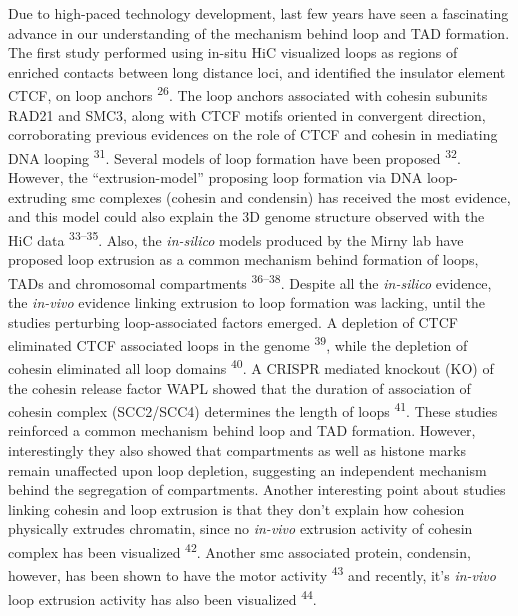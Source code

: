 \documentclass[11pt,twoside]{MPIthesis}
\theoremstyle{definition}
\theoremstyle{definition}
\theoremstyle{definition}
\theoremstyle{remark}
\begin{document}
Due to high-paced technology development, last few years have seen a
fascinating advance in our understanding of the mechanism behind loop
and TAD formation. The first study performed using in-situ HiC
visualized loops as regions of enriched contacts between long distance
loci, and identified the insulator element CTCF, on loop anchors
\textsuperscript{26}. The loop anchors associated with cohesin subunits
RAD21 and SMC3, along with CTCF motifs oriented in convergent direction,
corroborating previous evidences on the role of CTCF and cohesin in
mediating DNA looping \textsuperscript{31}. Several models of loop
formation have been proposed \textsuperscript{32}. However, the
``extrusion-model'' proposing loop formation via DNA loop-extruding smc
complexes (cohesin and condensin) has received the most evidence, and
this model could also explain the 3D genome structure observed with the
HiC data \textsuperscript{33--35}. Also, the \emph{in-silico} models
produced by the Mirny lab have proposed loop extrusion as a common
mechanism behind formation of loops, TADs and chromosomal compartments
\textsuperscript{36--38}. Despite all the \emph{in-silico} evidence, the
\emph{in-vivo} evidence linking extrusion to loop formation was lacking,
until the studies perturbing loop-associated factors emerged. A
depletion of CTCF eliminated CTCF associated loops in the genome
\textsuperscript{39}, while the depletion of cohesin eliminated all loop
domains \textsuperscript{40}. A CRISPR mediated knockout (KO) of the
cohesin release factor WAPL showed that the duration of association of
cohesin complex (SCC2/SCC4) determines the length of loops
\textsuperscript{41}. These studies reinforced a common mechanism behind
loop and TAD formation. However, interestingly they also showed that
compartments as well as histone marks remain unaffected upon loop
depletion, suggesting an independent mechanism behind the segregation of
compartments. Another interesting point about studies linking cohesin
and loop extrusion is that they don't explain how cohesion physically
extrudes chromatin, since no \emph{in-vivo} extrusion activity of
cohesin complex has been visualized \textsuperscript{42}. Another smc
associated protein, condensin, however, has been shown to have the motor
activity \textsuperscript{43} and recently, it's \emph{in-vivo} loop
extrusion activity has also been visualized \textsuperscript{44}.
\end{document}
